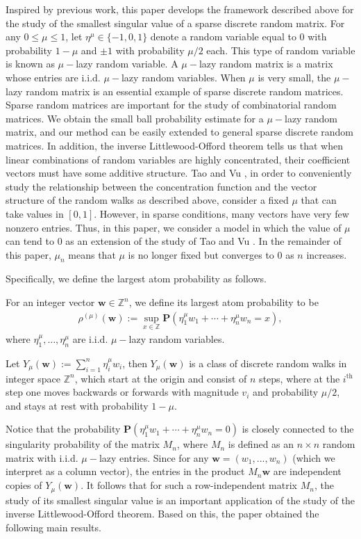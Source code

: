 \documentclass{article}
\numberwithin{equation}{section}
\theoremstyle{plain}
\begin{document}
Inspired by previous work, this paper develops the framework described above for the study of the smallest singular value of a sparse discrete random matrix.
For any $0 \leq \mu \leq 1$, let $\eta^\mu \in\{-1,0,1\}$ denote a random variable equal to 0 with probability $1-\mu$ and $\pm 1$ with probability $\mu / 2$ each. This type of random variable is known as $\mu-$lazy random variable. A $\mu-$lazy random matrix is a matrix whose entries are i.i.d. $\mu-$lazy random variables. When $\mu$ is very small, the $\mu-$lazy random matrix is an essential example of sparse discrete random matrices. Sparse random matrices are important for the study of combinatorial random matrices. 
We obtain the small ball probability estimate for a $\mu-$lazy random matrix, and our method can be easily extended to general sparse discrete random matrices. In addition, the inverse Littlewood-Offord theorem tells us that when linear combinations of random variables are highly concentrated, their coefficient vectors must have some additive structure. Tao and Vu \cite{MR2480613}, in order to conveniently study the relationship between the concentration function and the vector structure of the random walks as described above, consider a fixed $\mu$ that can take values in $[0,1]$. However, in sparse conditions, many vectors have very few nonzero entries. Thus, in this paper, we consider a model in which the value of $\mu$ can tend to 0 as an extension of the study of Tao and Vu \cite{MR2480613}. In the remainder of this paper, $\mu_n$ means that $\mu$ is no longer fixed but converges to $0$ as $n$ increases.
\par
Specifically, we define the largest atom probability as follows.
\par
For an integer vector $\boldsymbol{w} \in \mathbb{Z}^n$, we define its largest atom probability to be
\begin{align*}
\rho^{(\mu)}(\boldsymbol{w}):=\sup _{x \in \mathbb{Z}} \textbf{P}\left(\eta^\mu_1 w_1+\cdots+\eta^\mu_n w_n=x\right),
\end{align*}
where $\eta^\mu_1, \ldots, \eta^\mu_n$ are i.i.d. $\mu-$lazy random variables.
\par
Let $Y_\mu(\boldsymbol{w}) := \sum_{i=1}^n\eta_i^{\mu}w_i$, then $Y_\mu(\boldsymbol{w})$ is a class of discrete random walks in integer space $\mathbb{Z}^n$, which start at the origin and consist of $n$ steps, where at the $i^{\text {th }}$ step one moves backwards or forwards with magnitude $v_i$ and probability $\mu / 2$, and stays at rest with probability $1-\mu$.
\par
Notice that the probability $\textbf{P}\left(\eta^\mu_1 w_1+\cdots+\eta^\mu_n w_n=0\right)$ is closely connected to the singularity probability of the matrix $M_n$, where $M_n$ is defined as an $n \times n$ random matrix with i.i.d. $\mu-$lazy entries. Since for any $\boldsymbol{w}=(w_1,...,w_n)$ (which we interpret as a column
vector), the entries in the product $M_n\boldsymbol{w}$ are independent copies of $Y_\mu(\boldsymbol{w})$. It follows that for such a row-independent matrix $M_n$, the study of its smallest singular value is an important application of the study of the inverse Littlewood-Offord theorem. Based on this, the paper obtained the following main results.
\end{document}
